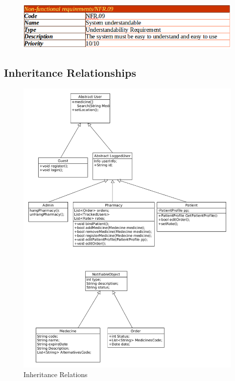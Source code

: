 \documentclass[]{article}
\begin{document}
\begin{figure}[H]
\centering
\includegraphics[scale=0.4]{./nonf/11}
\end{figure}


\subsection{Inheritance Relationships}
\begin{figure}[H]
\centering
\includegraphics[scale=0.4]{./classdiagram/InhertanceRelations}
\caption{Inheritance Relations}
\end{figure}
\end{document}
